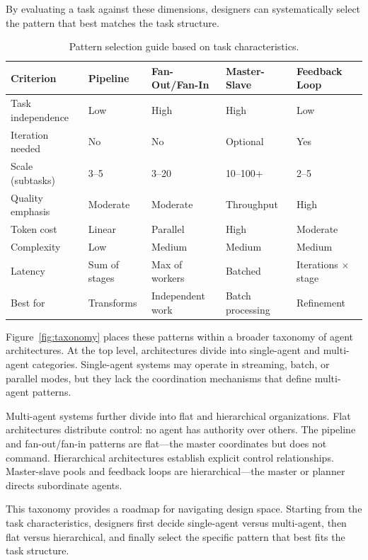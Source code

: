 By evaluating a task against these dimensions, designers can systematically select the pattern that best matches the task structure.

\begin{table}[t]
\centering
\caption{Pattern selection guide based on task characteristics.}
\label{tab:selection_guide}
\small
\begin{tabularx}{\textwidth}{l X X X X}
\toprule
\textbf{Criterion} & \textbf{Pipeline} & \textbf{Fan-Out/Fan-In} & \textbf{Master-Slave} & \textbf{Feedback Loop} \\
\midrule
Task independence & Low & High & High & Low \\
Iteration needed & No & No & Optional & Yes \\
Scale (subtasks) & 3--5 & 3--20 & 10--100+ & 2--5 \\
Quality emphasis & Moderate & Moderate & Throughput & High \\
Token cost & Linear & Parallel & High & Moderate \\
Complexity & Low & Medium & Medium & Medium \\
Latency & Sum of stages & Max of workers & Batched & Iterations $\times$ stage \\
Best for & Transforms & Independent work & Batch processing & Refinement \\
\bottomrule
\end{tabularx}
\end{table}

Figure~\ref{fig:taxonomy} places these patterns within a broader taxonomy of agent architectures.
At the top level, architectures divide into single-agent and multi-agent categories.
Single-agent systems may operate in streaming, batch, or parallel modes, but they lack the coordination mechanisms that define multi-agent patterns.

Multi-agent systems further divide into flat and hierarchical organizations.
Flat architectures distribute control: no agent has authority over others.
The pipeline and fan-out/fan-in patterns are flat---the master coordinates but does not command.
Hierarchical architectures establish explicit control relationships.
Master-slave pools and feedback loops are hierarchical---the master or planner directs subordinate agents.

This taxonomy provides a roadmap for navigating design space.
Starting from the task characteristics, designers first decide single-agent versus multi-agent, then flat versus hierarchical, and finally select the specific pattern that best fits the task structure.

